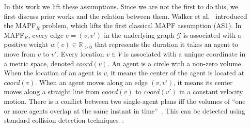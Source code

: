 \documentclass[review]{elsarticle}
\newcommand\roni[1]{\nb{\textbf{Roni:}}{green}{#1}}
\newcommand{\mapfr}{\ac{MAPF}$_R$\xspace}
\newcommand{\mapfect}{\mapfr-CT\xspace}
\newcommand{\mapf}{\ac{MAPF}\xspace}
\newcommand{\coord}{\textit{coord}\xspace}
\begin{document}




In this work we lift these assumptions. 
Since we are not the first to do this, we first discuss prior works and the relation between them. 
Walker et al.~\cite{walker2018extended} introduced the \mapfr problem, which lifts the first classical \mapf assumption (AS1). 
In \mapfr, every edge $e=(v,v')$ in the underlying graph $\mathcal{G}$ is associated with a positive weight $w(e)\in \mathbb{R}_{>0}$ that represents the duration it takes an agent to move from $v$ to $v'$. 
Every location $v\in V$ is associated with a unique coordinate in a metric space, denoted $\coord(v)$. 
An agent is a circle with a non-zero volume. 
When the location of an agent is $v$, it means the center of the agent is located at $\coord(v)$. 
When an agent moves along an edge $(v,v')$, it means
its center moves along a straight line from $\coord(v)$ to $\coord(v')$ in a constant velocity motion. 
There is a conflict between two single-agent plans iff the volumes of ``one or more agents overlap at the same instant in time''~\cite{walker2018extended}. This can be detected using standard collision detection techniques~\cite{helpHere}. 
\end{document}
